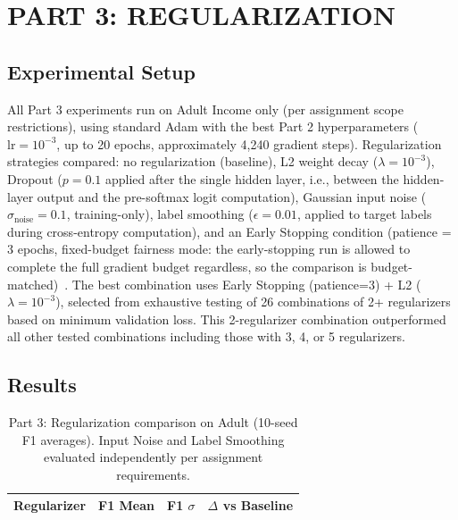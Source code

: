 \documentclass[letterpaper, 10 pt, conference]{ieeeconf}
\begin{document}
\section{PART 3: REGULARIZATION}
\label{sec:part3}

\subsection{Experimental Setup}

All Part 3 experiments run on Adult Income only (per assignment scope restrictions), using standard Adam with the best Part 2 hyperparameters ($\text{lr} = 10^{-3}$, up to 20 epochs, approximately 4{,}240 gradient steps). Regularization strategies compared: no regularization (baseline), L2 weight decay ($\lambda = 10^{-3}$), Dropout ($p = 0.1$ applied after the single hidden layer, i.e., between the hidden-layer output and the pre-softmax logit computation), Gaussian input noise ($\sigma_{\text{noise}} = 0.1$, training-only), label smoothing ($\epsilon = 0.01$, applied to target labels during cross-entropy computation), and an Early Stopping condition (patience = 3 epochs, fixed-budget fairness mode: the early-stopping run is allowed to complete the full gradient budget regardless, so the comparison is budget-matched)~\cite{prechelt1998}. The best combination uses Early Stopping (patience=3) + L2 ($\lambda = 10^{-3}$), selected from exhaustive testing of 26 combinations of 2+ regularizers based on minimum validation loss. This 2-regularizer combination outperformed all other tested combinations including those with 3, 4, or 5 regularizers.

\subsection{Results}

\begin{table}[!htbp]
    \centering
    \caption{Part 3: Regularization comparison on Adult (10-seed F1 averages). Input Noise and Label Smoothing evaluated independently per assignment requirements.}
    \label{tab:part3}
    \setlength{\tabcolsep}{3pt}
    \begin{tabular}{@{}lccc@{}}
    \toprule
    Regularizer & F1 Mean & F1 $\sigma$ & $\Delta$ vs Baseline \\
    \midrule
    
    \bottomrule
    \end{tabular}
\end{table}
\end{document}
